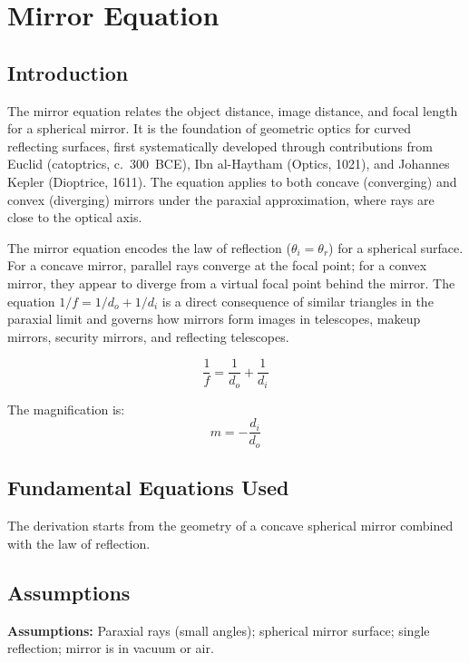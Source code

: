 \chapter{Mirror Equation}

\section*{Introduction}

The mirror equation relates the object distance, image distance, and focal length for a spherical mirror. It is the foundation of geometric optics for curved reflecting surfaces, first systematically developed through contributions from Euclid (catoptrics, c.~300~BCE), Ibn al-Haytham (Optics, 1021), and Johannes Kepler (Dioptrice, 1611). The equation applies to both concave (converging) and convex (diverging) mirrors under the paraxial approximation, where rays are close to the optical axis.

The mirror equation encodes the law of reflection ($\theta_{i} = \theta_{r}$) for a spherical surface. For a concave mirror, parallel rays converge at the focal point; for a convex mirror, they appear to diverge from a virtual focal point behind the mirror. The equation $1/f = 1/d_{o} + 1/d_{i}$ is a direct consequence of similar triangles in the paraxial limit and governs how mirrors form images in telescopes, makeup mirrors, security mirrors, and reflecting telescopes.


\begin{equation}
\boxed{\; \frac{1}{f} = \frac{1}{d_{o}} + \frac{1}{d_{i}}\;}
\label{eq:mirror}
\end{equation}

The magnification is:
\begin{equation}
m = -\frac{d_{i}}{d_{o}}
\label{eq:magnification}
\end{equation}

\section*{Fundamental Equations Used}

The derivation starts from the geometry of a concave spherical mirror combined with the law of reflection.

\section*{Assumptions}

\textbf{Assumptions:} Paraxial rays (small angles); spherical mirror surface; single reflection; mirror is in vacuum or air.


